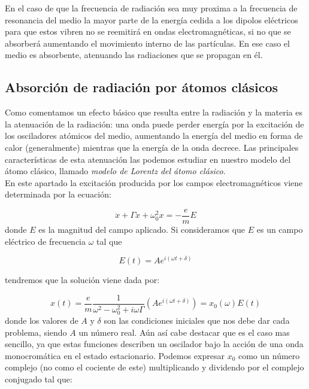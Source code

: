 \documentclass[12pt,a4paper]{article}
\newcommand{\parentesis}[1]{\left( #1  \right)}
\numberwithin{equation}{section}
\numberwithin{figure}{section}
\begin{document}
En el caso de que la frecuencia de radiación sea muy proxima a la frecuencia de resonancia del medio la mayor parte de la energía cedida a los dipolos eléctricos para que estos vibren no se reemitirá en ondas electromagnéticas, si no que se absorberá aumentando el movimiento interno de las partículas. En ese caso el medio es absorbente, atenuando las radiaciones que se propagan en él.

\subsection{Absorción de radiación por átomos clásicos}

Como comentamos un efecto básico que resulta entre la radiación y la materia es la atenuación de la radiación: una onda puede perder energía por la excitación de los osciladores atómicos del medio, aumentando la energía del medio en forma de calor (generalmente) mientras que la energía de la onda decrece. Las principales características de esta atenuación las podemos estudiar en nuestro modelo del átomo clásico, llamado \textit{modelo de Lorentz del átomo clásico}. \\

En este apartado la excitación producida por los campos electromagnéticos viene determinada por la ecuación:

\begin{equation}
\ddot{x} +  \Gamma \dot{x} + \omega^2_0 x  = - \dfrac{e}{m} E
\end{equation}
donde $E$ es la magnitud del campo aplicado. Si consideramos que $E$ es un campo eléctrico de frecuencia $\omega$ tal que

\begin{equation}
E(t) = A e^{i( \omega t  + \delta)}
\end{equation}


tendremos que la solución viene dada por:

\begin{equation}
x (t) = \dfrac{e}{m}  \dfrac{1}{\omega^2-\omega^2_0 + i \omega \Gamma} \parentesis{A e^{i (\omega t+\delta)}} = x_0 (\omega) E(t) \label{Ec:7.3.0.12}
\end{equation}
donde los valores de $A$ y $\delta$ son las condiciones iniciales que nos debe dar cada problema, siendo $A$ un número real. Aún así cabe destacar que es el caso mas sencillo, ya que estas funciones describen un oscilador bajo la acción de una onda monocromática en el estado estacionario. Podemos expresar $x_0$ como un número complejo (no como el cociente de este) multiplicando y dividendo por el complejo conjugado tal que:
\end{document}
